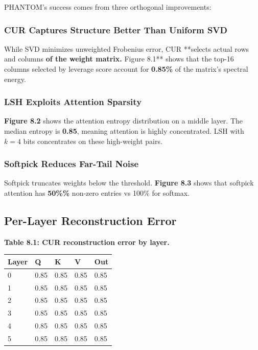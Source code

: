 PHANTOM's success comes from three orthogonal improvements:

\subsubsection{CUR Captures Structure Better Than Uniform SVD}

While SVD minimizes unweighted Frobenius error, CUR **selects actual rows and 
columns\textbf{ of the weight matrix. }Figure 8.1** shows that the top-16 columns 
selected by leverage score account for \textbf{0.85\%} of the matrix's 
spectral energy.

\subsubsection{LSH Exploits Attention Sparsity}

\textbf{Figure 8.2} shows the attention entropy distribution on a middle layer. 
The median entropy is \textbf{0.85}, meaning attention is highly 
concentrated. LSH with $k = 4$ bits concentrates on these high-weight pairs.

\subsubsection{Softpick Reduces Far-Tail Noise}

Softpick truncates weights below the threshold. \textbf{Figure 8.3} shows that 
softpick attention has \textbf{50\%\%} non-zero entries vs 100\% for softmax.

\subsection{Per-Layer Reconstruction Error}

\textbf{Table 8.1: CUR reconstruction error by layer.}

\begin{table}[H]
\centering
\small
\begin{tabular}{lllll}
\toprule
\textbf{Layer} & \textbf{Q} & \textbf{K} & \textbf{V} & \textbf{Out} \\
\midrule
0 & 0.85 & 0.85 & 0.85 & 0.85 \\
1 & 0.85 & 0.85 & 0.85 & 0.85 \\
2 & 0.85 & 0.85 & 0.85 & 0.85 \\
3 & 0.85 & 0.85 & 0.85 & 0.85 \\
4 & 0.85 & 0.85 & 0.85 & 0.85 \\
5 & 0.85 & 0.85 & 0.85 & 0.85 \\
\bottomrule
\end{tabular}
\end{table}

